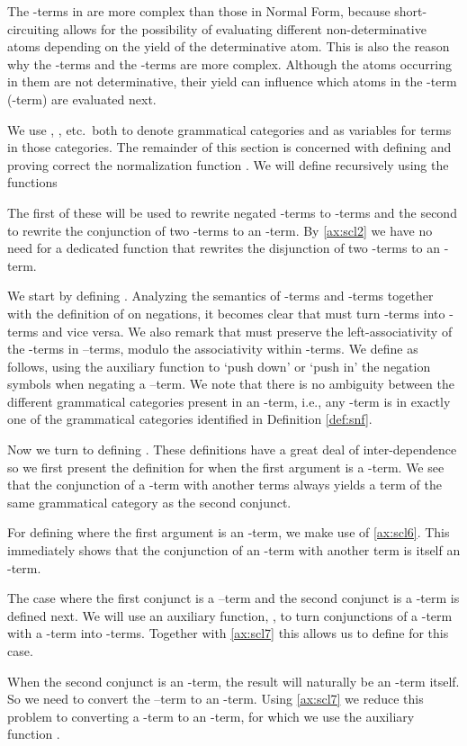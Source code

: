 The -terms in  are more complex than those in  Normal Form,
because short-circuiting allows for the possibility of evaluating different
non-determinative atoms depending on the yield of the determinative atom. This
is also the reason why the -terms and the -terms are more
complex. Although the atoms occurring in them are not determinative, their
yield can influence which atoms in the -term (-term) are
evaluated next.

We use , , etc.~both to denote grammatical categories and as
variables for terms in those categories. The remainder of this section is
concerned with defining and proving correct the normalization function . We will define  recursively using the functions

The first of these will be used to rewrite negated -terms to -terms
and the second to rewrite the conjunction of two -terms to an
-term. By \eqref{ax:scl2} we have no need for a dedicated function that
rewrites the disjunction of two -terms to an -term.

We start by defining . Analyzing the semantics of -terms and
-terms together with the definition of  on negations, it becomes
clear that  must turn -terms into -terms and vice versa.
We also remark that  must preserve the left-associativity of the
-terms in --terms, modulo the associativity within -terms.
We define  as follows, using the auxiliary function
 to `push down' or `push in' the negation symbols when
negating a --term. We note that there is no ambiguity between the
different grammatical categories present in an -term, i.e., any
-term is in exactly one of the grammatical categories identified in
Definition
\ref{def:snf}.


Now we turn to defining . These definitions have a great deal of
inter-dependence so we first present the definition for  when the first
argument is a -term. We see that the conjunction of a -term with
another terms always yields a term of the same grammatical category as the
second conjunct. 


For defining  where the first argument is an -term, we make use
of \eqref{ax:scl6}. This immediately shows that the conjunction of an
-term with another term is itself an -term.


The case where the first conjunct is a --term and the second conjunct
is a -term is defined next. We will use an auxiliary function,
, to turn conjunctions of a -term with
a -term into -terms. Together with \eqref{ax:scl7} this allows us to
define  for this case.


When the second conjunct is an -term, the result will naturally be an
-term itself. So we need to convert the --term to an
-term. Using \eqref{ax:scl7} we reduce this problem to converting a
-term to an -term, for which we use the auxiliary function
.


